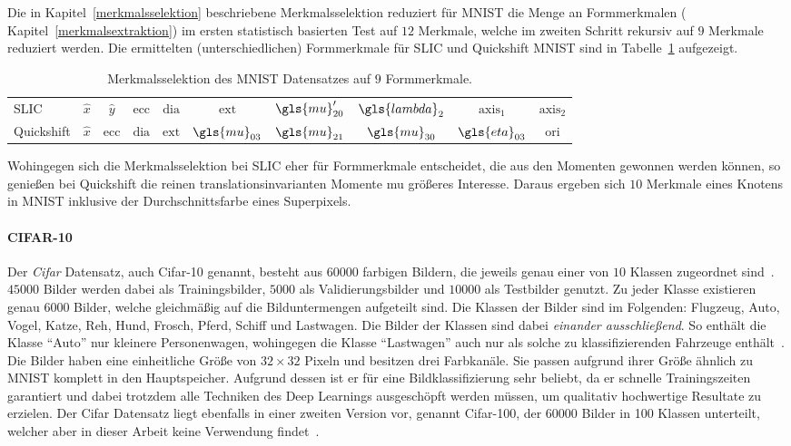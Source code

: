 Die in Kapitel~\ref{merkmalsselektion} beschriebene Merkmalsselektion reduziert für \gls{MNIST} die Menge an Formmerkmalen (\vgl{} Kapitel~\ref{merkmalsextraktion}) im ersten statistisch basierten Test auf $12$ Merkmale, welche im zweiten Schritt rekursiv auf $9$ Merkmale reduziert werden.
Die ermittelten (unterschiedlichen) Formmerkmale für \gls{SLIC} und Quickshift \bzgl{} \gls{MNIST} sind in Tabelle~\ref{tab:mnist_merkmale} aufgezeigt.
\begin{table}[t]
\centering
\begin{tabular}{lccccccccc}
  \toprule
  \gls{SLIC} & $\hat{x}$ & $\hat{y}$ & $\mathrm{ecc}$ & $\mathrm{dia}$ & $\mathrm{ext}$ & $\gls{mu}^{\prime}_{20}$ & $\gls{lambda}_2$ & $\mathrm{axis}_1$ & $\mathrm{axis}_2$\\
  Quickshift & $\hat{x}$ & $\mathrm{ecc}$ & $\mathrm{dia}$ & $\mathrm{ext}$ & $\gls{mu}_{03}$ & $\gls{mu}_{21}$ & $\gls{mu}_{30}$ & $\gls{eta}_{03}$ & $\mathrm{ori}$\\
  \bottomrule
\end{tabular}
  \caption[\gls{MNIST} Merkmalsselektion]{Merkmalsselektion des \gls{MNIST} Datensatzes auf $9$ Formmerkmale.}
\label{tab:mnist_merkmale}
\end{table}
Wohingegen sich die Merkmalsselektion bei \gls{SLIC} eher für Formmerkmale entscheidet, die aus den Momenten gewonnen werden können, so genießen bei Quickshift die reinen translationsinvarianten Momente \gls{mu} größeres Interesse.
Daraus ergeben sich $10$ Merkmale eines Knotens in \gls{MNIST} inklusive der Durchschnittsfarbe eines Superpixels.

\paragraph{CIFAR-10}
\label{cifar_10}

Der \emph{\gls{Cifar}} Datensatz, auch \gls{Cifar}-10 genannt, besteht aus $60000$ farbigen Bildern, die jeweils genau einer von $10$ Klassen zugeordnet sind~\cite{cifar_10}.
$45000$ Bilder werden dabei als Trainingsbilder, $5000$ als Validierungsbilder und $10000$ als Testbilder genutzt.
Zu jeder Klasse existieren genau $6000$ Bilder, welche gleichmäßig auf die Bilduntermengen aufgeteilt sind.
Die Klassen der Bilder sind im Folgenden: Flugzeug, Auto, Vogel, Katze, Reh, Hund, Frosch, Pferd, Schiff und Lastwagen.
Die Bilder der Klassen sind dabei \emph{einander ausschließend}.
So enthält die Klasse \enquote{Auto} nur kleinere Personenwagen, wohingegen die Klasse \enquote{Lastwagen} auch nur als solche zu klassifizierenden Fahrzeuge enthält~\cite{cifar_10}.
Die Bilder haben eine einheitliche Größe von $32 \times 32$ Pixeln und besitzen drei Farbkanäle.
Sie passen aufgrund ihrer Größe ähnlich zu \gls{MNIST} komplett in den Hauptspeicher.
Aufgrund dessen ist er für eine Bildklassifizierung sehr beliebt, da er schnelle Trainingszeiten garantiert und dabei trotzdem alle Techniken des Deep Learnings ausgeschöpft werden müssen, um qualitativ hochwertige Resultate zu erzielen.
Der \gls{Cifar} Datensatz liegt ebenfalls in einer zweiten Version vor, genannt \gls{Cifar}-100, der 60000 Bilder in 100 Klassen unterteilt, welcher aber in dieser Arbeit keine Verwendung findet~\cite{cifar_10}.

